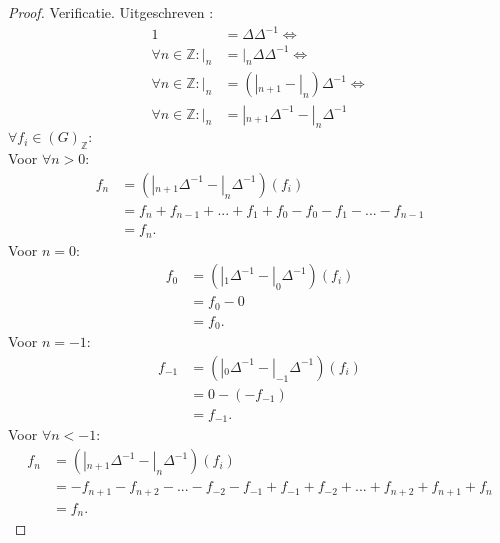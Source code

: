 \documentclass[a4paper,12pt]{article}
\begin{document}
\begin{proof}
    Verificatie. Uitgeschreven :
    \begin{align*}
        1                             & =  \Delta \Delta^{-1} \Leftrightarrow         \\
        \forall n \in \mathbb{Z}: |_n & = |_n \Delta \Delta^{-1}\Leftrightarrow       \\
        \forall n \in \mathbb{Z}: |_n & = (|_{n+1} - |_n) \Delta^{-1} \Leftrightarrow \\
        \forall n \in \mathbb{Z}: |_n & = |_{n+1}\Delta^{-1}  - |_n\Delta^{-1}
    \end{align*}
    $\forall f_i \in (G)_{\mathbb{Z}}:$\\
    Voor $\forall n>0:$
    \begin{align*}
        f_n & = (|_{n+1}\Delta^{-1}  - |_n\Delta^{-1}  )(f_i)            \\
            & =  f_{n}+f_{n-1}+...+f_1 +f_0  - f_0 - f_1 - ... - f_{n-1} \\
            & = f_n.
    \end{align*}
    Voor $n=0:$
    \begin{align*}
        f_0 & = (|_{1}\Delta^{-1}  - |_0\Delta^{-1}  )(f_i) \\
            & =  f_0 - 0                                    \\
            & = f_0.
    \end{align*}
    Voor $n=-1:$
    \begin{align*}
        f_{-1} & = (|_{0}\Delta^{-1}  - |_{-1}\Delta^{-1}  )(f_i) \\
               & =  0 - (-f_{-1})                                 \\
               & =  f_{-1}.
    \end{align*}
    Voor $\forall n<-1:$
    \begin{align*}
        f_n & = (|_{n+1}\Delta^{-1}  - |_n\Delta^{-1}  )(f_i)                                        \\
            & = -f_{n+1}-f_{n+2}-...-f_{-2}-f_{-1} + f_{-1} + f_{-2} + ... + f_{n+2} + f_{n+1} + f_n \\
            & = f_n.
    \end{align*}

\end{proof}


\end{document}
